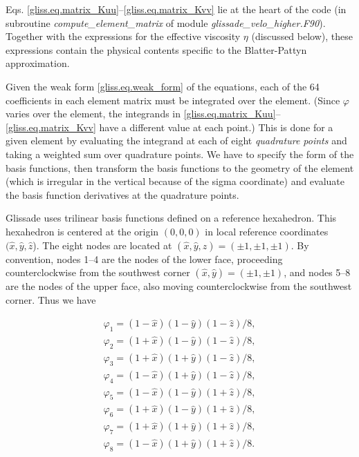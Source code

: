 Eqs. \eqref{gliss.eq.matrix_Kuu}--\eqref{gliss.eq.matrix_Kvv} lie at the heart of the code 
(in subroutine \textit{compute\_element\_matrix} of module \textit{glissade\_velo\_higher.F90}).
Together with the expressions for the effective viscosity $\eta$ (discussed below),
these expressions contain the physical contents specific to the Blatter-Pattyn approximation. 

Given the weak form \eqref{gliss.eq.weak_form} of the equations, each of the 64 coefficients in each
element matrix must be integrated over the element.  (Since $\varphi$ varies over the element,
the integrands in \eqref{gliss.eq.matrix_Kuu}--\eqref{gliss.eq.matrix_Kvv} 
have a different value at each point.)  
This is done for a given element by evaluating the integrand at each of 
eight \textit{quadrature points} and taking a weighted sum over quadrature points.
We have to specify the form of the basis functions, then transform the basis functions to
the geometry of the element (which is irregular in the vertical because of the sigma
coordinate) and evaluate the basis function derivatives at the quadrature points.

Glissade uses trilinear basis functions defined on a reference hexahedron.  
This hexahedron is centered at the origin $(0,0,0)$ in local reference coordinates 
$(\hat{x}, \hat{y}, \hat{z}$). 
The eight nodes are located at $(\hat{x}, \hat{y}, \hat{z}) = (\pm 1, \pm 1, \pm 1)$.
By convention, nodes 1--4 are the nodes of the lower face, proceeding counterclockwise
from the southwest corner $(\hat{x}, \hat{y}) = (±1, ±1)$, and nodes 5--8 are the nodes
of the upper face, also moving counterclockwise from the southwest corner.
Thus we have

\begin{equation}
  \label{gliss.eq.basis_functions}
  \begin{matrix}
    {{\varphi }_{1}}=(1-\hat{x})(1-\hat{y})(1-\hat{z})/8,  \\[3pt]
    {{\varphi }_{2}}=(1+\hat{x})(1-\hat{y})(1-\hat{z})/8,  \\[3pt]
    {{\varphi }_{3}}=(1+\hat{x})(1+\hat{y})(1-\hat{z})/8,  \\[3pt]
    {{\varphi }_{4}}=(1-\hat{x})(1+\hat{y})(1-\hat{z})/8,  \\[3pt]
    {{\varphi }_{5}}=(1-\hat{x})(1-\hat{y})(1+\hat{z})/8,  \\[3pt]
    {{\varphi }_{6}}=(1+\hat{x})(1-\hat{y})(1+\hat{z})/8,  \\[3pt]
    {{\varphi }_{7}}=(1+\hat{x})(1+\hat{y})(1+\hat{z})/8,  \\[3pt]
    {{\varphi }_{8}}=(1-\hat{x})(1+\hat{y})(1+\hat{z})/8.  \\
  \end{matrix}
\end{equation} 

